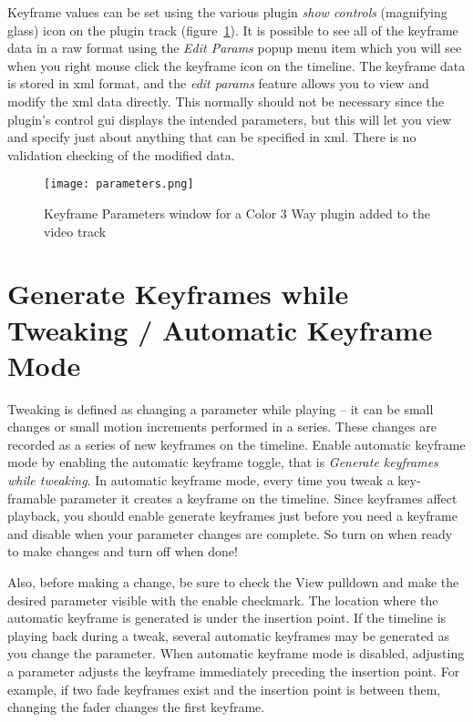Keyframe values can be set using the various plugin \textit{show controls} (magnifying glass) icon on the plugin track (figure~\ref{fig:parameters}).  It is possible to see all of the keyframe data in a raw format using the \textit{Edit Params} popup menu item which you will see when you right mouse click the keyframe icon on the timeline.  The keyframe data is stored in xml format, and the \textit{edit params} feature allows you to view and modify the xml data directly.  This normally should not be necessary since the plugin's control gui displays the intended parameters, but this will let you view and specify just about anything that can be specified in xml.  There is no validation checking of the modified data.

\begin{figure}[htpb]
    \centering
    \texttt{[image: parameters.png]}
    \caption{Keyframe Parameters window for a Color 3 Way plugin added to the video track}
    \label{fig:parameters}
\end{figure}

\section{Generate Keyframes while Tweaking / Automatic Keyframe Mode}%
\label{sec:generate_keyframe_tweaking}

Tweaking is defined as changing a parameter while playing -- it can be small changes or small motion increments performed in a series.  These changes are recorded as a series of new keyframes on the timeline.  Enable automatic keyframe mode by enabling the automatic keyframe toggle, that is \textit{Generate keyframes while tweaking}.  In automatic keyframe mode, every time you tweak a key-framable parameter it creates a keyframe on the timeline.  Since keyframes affect playback, you should enable generate keyframes just before you need a keyframe and disable when your parameter changes are complete.  So turn on when ready to make changes and turn off when done!

Also, before making a change, be sure to check the View pulldown and make the desired parameter visible with the enable checkmark.  The location where the automatic keyframe is generated is under the insertion point.  If the timeline is playing back during a tweak, several automatic keyframes may be generated as you change the parameter.  When automatic keyframe mode is disabled, adjusting a parameter adjusts the keyframe immediately preceding the insertion point.  For example, if two fade keyframes exist and the insertion point is between them, changing the fader changes the first keyframe.

